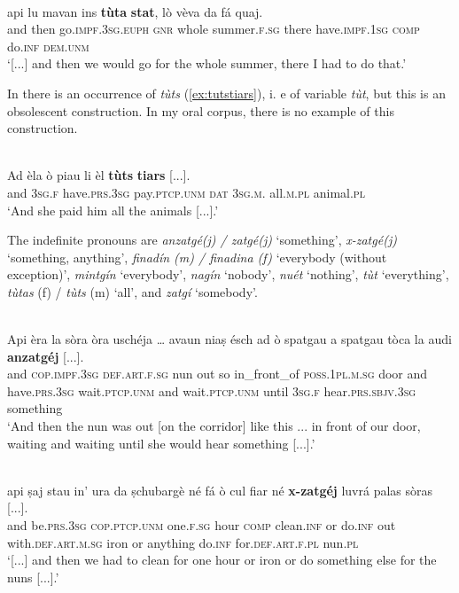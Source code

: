 \ea\label{}
\\
	\gll [..] api lu mavan ins \textbf{tùta} \textbf{stat}, lò vèva da fá quaj.\\
{} and then go.\textsc{impf.3sg.euph} \textsc{gnr} whole summer.\textsc{f.sg} there have.\textsc{impf.1sg} \textsc{comp} do.\textsc{inf} \textsc{dem.unm}\\
\glt `[...] and then we would go for the whole summer, there I had to do that.'
\z

In \citet[62]{Büchli1966} there is an occurrence of \textit{tùts} (\ref{ex:tutstiars}), i. e of variable \textit{tùt}, but this is an obsolescent construction. In my oral corpus, there is no example of this construction.

\ea
\label{ex:tutstiars}
\\
\gll Ad èla ò piau li èl \textbf{tùts} \textbf{tiars} [...].\\
and \textsc{3sg.f} have.\textsc{prs.3sg} pay.\textsc{ptcp.unm} \textsc{dat} \textsc{3sg.m.} all\textsc{.m.pl} animal.\textsc{pl}\\
\glt `And she paid him all the animals [...].'
\z

The indefinite pronouns are \textit{anzatgé(j) / zatgé(j)} `something', \textit{x-zatgé(j)} `something, anything', \textit{finadín (m) / finadina (f)} `everybody (without exception)', \textit{mintgín} `everybody', \textit{nagín} `nobody', \textit{nuét} `nothing',
 \textit{tùt} `everything', \textit{tùtas} (f) / \textit{tùts} (m) `all', and \textit{zatgí} `somebody'.
 

\ea
\label{}
\\
\gll    Api èra la sòra òra uschéja … avaun niaṣ ésch ad ò spatgau a spatgau tòca la audi \textbf{anzatgéj} [...].\\
and \textsc{cop.impf.3sg} \textsc{def.art.f.sg} nun out so {} in\_front\_of \textsc{poss.1pl.m.sg} door and have.\textsc{prs.3sg} wait.\textsc{ptcp.unm} and wait.\textsc{ptcp.unm} until \textsc{3sg.f} hear.\textsc{prs.sbjv.3sg} something\\
\glt `And then the nun was out [on the corridor] like this ... in front of our door, waiting and waiting until she would hear something  [...].'
\z

\ea
\label{}
\\
\gll [...] api ṣaj stau in’ ura da ṣchubargè né fá ò cul fiar né \textbf{x-zatgéj} luvrá palas sòras [...].\\
{} and be.\textsc{prs.3sg} \textsc{cop.ptcp.unm} one.\textsc{f.sg} hour \textsc{comp} clean.\textsc{inf} or do.\textsc{inf} out with.\textsc{def.art.m.sg} iron or anything do.\textsc{inf} for.\textsc{def.art.f.pl} nun.\textsc{pl} \\
\glt `[...] and then we had to clean for one hour or iron or do something else for the nuns [...].'
\z

